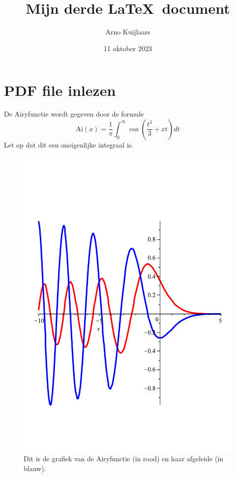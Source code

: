 \documentclass[11pt,a4paper]{article}
\title{Mijn derde \LaTeX\ document}
\author{Arno Kuijlaars}
\date{11 oktober 2023}
\begin{document}
\maketitle

\section{PDF file inlezen}
De Airyfunctie wordt gegeven door de formule
\[ \text{Ai}(x) = \frac{1}{\pi} \int_0^{\infty} \cos \left( \frac{t^3}{3} + xt\right) dt
\]
Let op dat dit een oneigenlijke integraal is.

\begin{figure}[h]
\centering
\includegraphics[scale=0.3]{Airyplot}
\caption{Dit is de grafiek van de Airyfunctie (in rood) 
en haar  afgeleide (in blauw).}
\end{figure}
\end{document}
